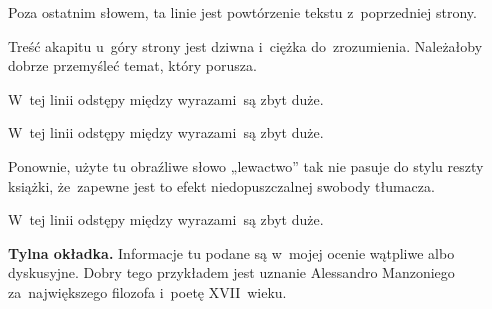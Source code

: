\documentclass[a4paper,11pt]{article}
\begin{document}
\vspace{\spaceFour}


\start {} Poza ostatnim słowem, ta linie jest powtórzenie
tekstu z~poprzedniej strony.

\vspace{\spaceFour}


\start {} Treść akapitu u~góry strony jest dziwna i~ciężka
do~zrozumienia. Należałoby dobrze przemyśleć temat, który porusza.

\vspace{\spaceFour}


\start {} W~tej linii odstępy między wyrazami~są zbyt
duże.

\vspace{\spaceFour}


\start {} W~tej linii odstępy między wyrazami~są zbyt
duże.

\vspace{\spaceFour}


\start {} Ponownie, użyte tu obraźliwe słowo „lewactwo”
tak nie pasuje do stylu reszty książki, że~zapewne jest to efekt
niedopuszczalnej swobody tłumacza.

\vspace{\spaceFour}


\start {} W~tej linii odstępy między wyrazami~są zbyt
duże.

\vspace{\spaceFour}


\start \textbf{Tylna okładka.} Informacje tu podane są w~mojej ocenie
wątpliwe albo dyskusyjne. Dobry tego przykładem jest uznanie
Alessandro Manzoniego za~największego filozofa i~poetę XVII~wieku.

\vspace{\spaceFour}





\end{document}

